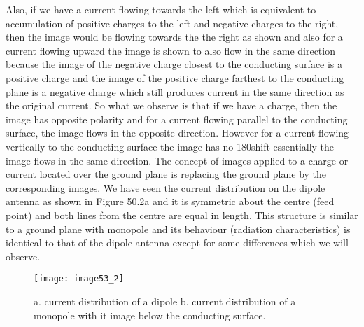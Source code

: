 Also, if we have a current flowing towards the left which is equivalent to accumulation of positive charges to the left and negative charges to the right, then the image would be flowing towards the the right as shown and also for a current flowing upward the image is shown to also flow in the same direction because the image of the negative charge closest to the conducting surface is a positive charge and the image of the positive charge farthest to the conducting plane is a negative charge which still produces current in the same direction as the original current. So what we observe is that if we have a charge, then the image has opposite polarity and for a current flowing parallel to the conducting surface, the image flows in the opposite direction. However for a current flowing vertically to the conducting surface the image has no 180\textdegree \space shift essentially the image flows in the same direction. The concept of images applied to a charge or current located over the ground plane is replacing the ground plane by the corresponding images. We have seen the current distribution on the dipole antenna as shown in Figure 50.2a and it is symmetric about the centre (feed point) and both lines from the centre are equal in length. This structure is similar to a ground plane with monopole and its behaviour (radiation characteristics) is identical to that of the dipole antenna except for some differences which we will observe.
\begin{figure}
	\centering
	\texttt{[image: image53\_2]}
	\caption{a. current distribution of a dipole 
		b. current distribution of a monopole with it image below the conducting surface.}
	\label{fig:fig2}
\end{figure}

